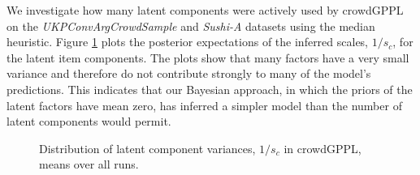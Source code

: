 We investigate how many latent components were actively used by 
 crowdGPPL on the \emph{UKPConvArgCrowdSample} and \emph{Sushi-A} datasets 
 using the median heuristic.
Figure \ref{fig:latent_factor_variance}
plots the posterior expectations of the inferred scales, $1/s_c$, for the latent item 
 components. 
 The plots show
that many factors have a very small variance and therefore do not contribute strongly 
to many of the model's predictions. This indicates that our Bayesian approach, in which the priors
of the latent factors have mean zero, has inferred a simpler model than the
number of latent components would permit.
\begin{figure}
\centering
{}
\caption{
Distribution of latent component variances, $1/s_c$ in crowdGPPL, means over all runs.
}
\label{fig:latent_factor_variance}
\end{figure}
